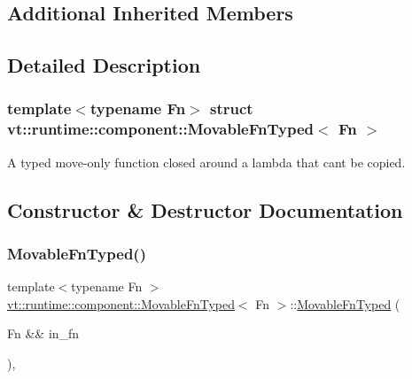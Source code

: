 \subsection*{Additional Inherited Members}


\subsection{Detailed Description}
\subsubsection*{template$<$typename Fn$>$\newline
struct vt\+::runtime\+::component\+::\+Movable\+Fn\+Typed$<$ Fn $>$}

A typed move-\/only function closed around a lambda that can\textquotesingle{}t be copied. 



\subsection{Constructor \& Destructor Documentation}
\mbox{\label{structvt_1_1runtime_1_1component_1_1_movable_fn_typed_a3e4c8f91febea73dd6f3ce486fa0f5d8}} 
\subsubsection{\texorpdfstring{Movable\+Fn\+Typed()}{MovableFnTyped()}}
{\footnotesize\ttfamily template$<$typename Fn $>$ \\
\hyperlink{structvt_1_1runtime_1_1component_1_1_movable_fn_typed}{vt\+::runtime\+::component\+::\+Movable\+Fn\+Typed}$<$ Fn $>$\+::\hyperlink{structvt_1_1runtime_1_1component_1_1_movable_fn_typed}{Movable\+Fn\+Typed} (\begin{DoxyParamCaption}\item[{Fn \&\&}]{in\+\_\+fn }\end{DoxyParamCaption})\hspace{0.3cm}{\ttfamily [inline]}, {\ttfamily [explicit]}}



